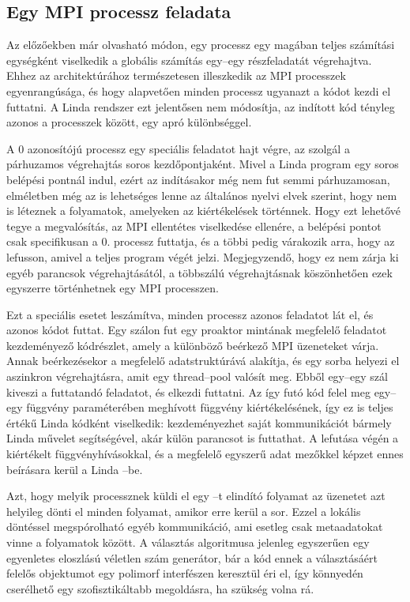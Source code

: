 \subsection{Egy MPI processz feladata}\label{subsec:ranks}

Az előzőekben már olvasható módon, egy processz egy magában teljes számítási egységként viselkedik a globális számítás egy--egy részfeladatát végrehajtva.
Ehhez az architektúrához természetesen illeszkedik az MPI processzek egyenrangúsága, és hogy alapvetően minden processz ugyanazt a kódot kezdi el futtatni.
A Linda rendszer ezt jelentősen nem módosítja, az indított kód tényleg azonos a processzek között, egy apró különbséggel.

A $0$ azonosítójú processz egy speciális feladatot hajt végre, az szolgál a párhuzamos végrehajtás soros kezdőpontjaként.
Mivel a Linda program egy soros belépési pontnál indul, ezért az indításakor még nem fut semmi párhuzamosan, elméletben még az is lehetséges lenne az általános nyelvi elvek szerint, hogy nem is léteznek a folyamatok, amelyeken az  kiértékelések történnek.
Hogy ezt lehetővé tegye a megvalósítás, az MPI ellentétes viselkedése ellenére, a belépési pontot csak specifikusan a $0.$ processz futtatja, és a többi pedig várakozik arra, hogy az lefusson, amivel a teljes program végét jelzi.
Megjegyzendő, hogy ez nem zárja ki egyéb  parancsok végrehajtásától, a többszálú végrehajtásnak köszönhetően ezek egyszerre történhetnek egy MPI processzen.

Ezt a speciális esetet leszámítva, minden processz azonos feladatot lát el, és azonos kódot futtat.
Egy szálon fut egy proaktor mintának megfelelő feladatot kezdeményező kódrészlet, amely a különböző beérkező MPI üzeneteket várja.
Annak beérkezésekor a megfelelő adatstruktúrává alakítja, és egy sorba helyezi el aszinkron végrehajtásra, amit egy thread--pool valósít meg.
Ebből egy--egy szál kiveszi a futtatandó feladatot, és elkezdi futtatni.
Az így futó kód felel meg egy--egy  függvény paraméterében meghívott függvény kiértékelésének, így ez is teljes értékű Linda kódként viselkedik: kezdeményezhet saját kommunikációt bármely Linda művelet segítségével, akár külön  parancsot is futtathat.
A lefutása végén a kiértékelt függvényhívásokkal, és a megfelelő egyszerű adat mezőkkel képzet ennes beírásara kerül a Linda \ts{}--be.

Azt, hogy melyik processznek küldi el egy --t elindító folyamat az üzenetet azt helyileg dönti el minden folyamat, amikor erre kerül a sor.
Ezzel a lokális döntéssel megspórolható egyéb kommunikáció, ami esetleg csak metaadatokat vinne a folyamatok között.
A választás algoritmusa jelenleg egyszerűen egy egyenletes eloszlású véletlen szám generátor, bár a kód ennek a választásáért felelős objektumot egy polimorf interfészen keresztül éri el, így könnyedén cserélhető egy szofisztikáltabb megoldásra, ha szükség volna rá.


